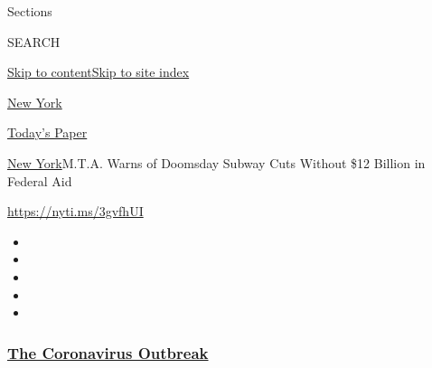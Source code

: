 Sections

SEARCH

\protect\hyperlink{site-content}{Skip to
content}\protect\hyperlink{site-index}{Skip to site index}

\href{https://www.nytimes3xbfgragh.onion/section/nyregion}{New York}

\href{https://myaccount.nytimes3xbfgragh.onion/auth/login?response_type=cookie\&client_id=vi}{}

\href{https://www.nytimes3xbfgragh.onion/section/todayspaper}{Today's
Paper}

\href{/section/nyregion}{New York}\textbar{}M.T.A. Warns of Doomsday
Subway Cuts Without \$12 Billion in Federal Aid

\url{https://nyti.ms/3gvfhUI}

\begin{itemize}
\item
\item
\item
\item
\item
\end{itemize}

\hypertarget{the-coronavirus-outbreak}{%
\subsubsection{\texorpdfstring{\href{https://www.nytimes3xbfgragh.onion/news-event/coronavirus?name=styln-coronavirus-national\&region=TOP_BANNER\&block=storyline_menu_recirc\&action=click\&pgtype=Article\&impression_id=ab260d30-f4bf-11ea-946f-8d50c943ff29\&variant=undefined}{The
Coronavirus
Outbreak}}{The Coronavirus Outbreak}}\label{the-coronavirus-outbreak}}

